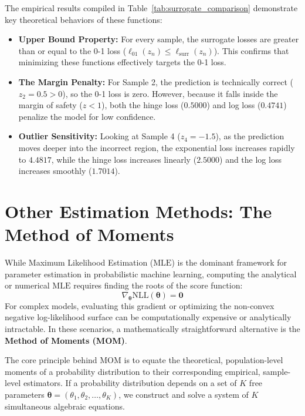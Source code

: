 \documentclass{article}
\begin{document}
The empirical results compiled in Table~\ref{tab:surrogate_comparison} demonstrate key theoretical behaviors of these functions:
\begin{itemize}
    \item \textbf{Upper Bound Property:} For every sample, the surrogate losses are greater than or equal to the 0-1 loss ($\ell_{01}(z_n) \leq \ell_{\text{surr}}(z_n)$). This confirms that minimizing these functions effectively targets the 0-1 loss.
    \item \textbf{The Margin Penalty:} For Sample 2, the prediction is technically correct ($z_2 = 0.5 > 0$), so the 0-1 loss is zero. However, because it falls inside the margin of safety ($z < 1$), both the hinge loss ($0.5000$) and log loss ($0.4741$) penalize the model for low confidence.
    \item \textbf{Outlier Sensitivity:} Looking at Sample 4 ($z_4 = -1.5$), as the prediction moves deeper into the incorrect region, the exponential loss increases rapidly to $4.4817$, while the hinge loss increases linearly ($2.5000$) and the log loss increases smoothly ($1.7014$).
\end{itemize}

\section{Other Estimation Methods: The Method of Moments}

While Maximum Likelihood Estimation ($\text{MLE}$) is the dominant framework for parameter estimation in probabilistic machine learning, computing the analytical or numerical $\text{MLE}$ requires finding the roots of the score function:
\begin{equation}
\nabla_{\boldsymbol{\theta}} \text{NLL}(\boldsymbol{\theta}) = \mathbf{0}
\end{equation}
For complex models, evaluating this gradient or optimizing the non-convex negative log-likelihood surface can be computationally expensive or analytically intractable. In these scenarios, a mathematically straightforward alternative is the \textbf{Method of Moments (MOM)}.

The core principle behind $\text{MOM}$ is to equate the theoretical, population-level moments of a probability distribution to their corresponding empirical, sample-level estimators. If a probability distribution depends on a set of $K$ free parameters $\boldsymbol{\theta} = (\theta_1, \theta_2, \dots, \theta_K)$, we construct and solve a system of $K$ simultaneous algebraic equations. 
\end{document}
